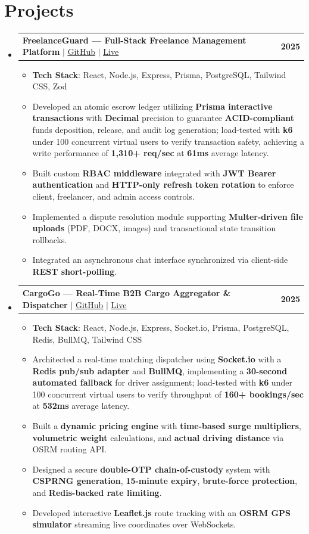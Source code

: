 \documentclass[letterpaper,11pt]{article}
\makeatletter
\newcommand{\resumeItem}[1]{
  \item\small{
    {#1 \vspace{-2pt}}
  }
}
\newcommand{\resumeProjectHeading}[2]{
    \item
    \begin{tabular*}{1.001\textwidth}{l@{\extracolsep{\fill}}r}
      \small#1 & \textbf{\small #2}\\
    \end{tabular*}\vspace{-7pt}
}
\newcommand{\resumeSubHeadingListStart}{\begin{itemize}[leftmargin=0.0in, label={}]}
\newcommand{\resumeSubHeadingListEnd}{\end{itemize}}
\newcommand{\resumeItemListStart}{\begin{itemize}}
\newcommand{\resumeItemListEnd}{\end{itemize}\vspace{-5pt}}
\makeatother
\begin{document}
\section{Projects}
    \vspace{-5pt}
    \resumeSubHeadingListStart
      \resumeProjectHeading
          {\textbf{FreelanceGuard — Full-Stack Freelance Management Platform} $|$ \href{https://github.com/aadi17-arch/FreelanceGuard}{\underline{GitHub}} $|$ \href{https://freelance-guard-mu.vercel.app}{\underline{Live}}}{2025}
          \resumeItemListStart
            \resumeItem{\textbf{Tech Stack}: React, Node.js, Express, Prisma, PostgreSQL, Tailwind CSS, Zod}
            \resumeItem{Developed an atomic escrow ledger utilizing \textbf{Prisma interactive transactions} with \textbf{Decimal} precision to guarantee \textbf{ACID-compliant} funds deposition, release, and audit log generation; load-tested with \textbf{k6} under 100 concurrent virtual users to verify transaction safety, achieving a write performance of \textbf{1,310+ req/sec} at \textbf{61ms} average latency.}
            \resumeItem{Built custom \textbf{RBAC middleware} integrated with \textbf{JWT Bearer authentication} and \textbf{HTTP-only refresh token rotation} to enforce client, freelancer, and admin access controls.}
            \resumeItem{Implemented a dispute resolution module supporting \textbf{Multer-driven file uploads} (PDF, DOCX, images) and transactional state transition rollbacks.}
            \resumeItem{Integrated an asynchronous chat interface synchronized via client-side \textbf{REST short-polling}.}
          \resumeItemListEnd
          \vspace{-13pt}
      \resumeProjectHeading
          {\textbf{CargoGo — Real-Time B2B Cargo Aggregator \& Dispatcher} $|$ \href{https://github.com/aadi17-arch/cargogo}{\underline{GitHub}} $|$ \href{https://cargogo-six.vercel.app}{\underline{Live}}}{2025}
          \resumeItemListStart
            \resumeItem{\textbf{Tech Stack}: React, Node.js, Express, Socket.io, Prisma, PostgreSQL, Redis, BullMQ, Tailwind CSS}
            \resumeItem{Architected a real-time matching dispatcher using \textbf{Socket.io} with a \textbf{Redis pub/sub adapter} and \textbf{BullMQ}, implementing a \textbf{30-second automated fallback} for driver assignment; load-tested with \textbf{k6} under 100 concurrent virtual users to verify throughput of \textbf{160+ bookings/sec} at \textbf{532ms} average latency.}
            \resumeItem{Built a \textbf{dynamic pricing engine} with \textbf{time-based surge multipliers}, \textbf{volumetric weight} calculations, and \textbf{actual driving distance} via OSRM routing API.}
            \resumeItem{Designed a secure \textbf{double-OTP chain-of-custody} system with \textbf{CSPRNG generation}, \textbf{15-minute expiry}, \textbf{brute-force protection}, and \textbf{Redis-backed rate limiting}.}
            \resumeItem{Developed interactive \textbf{Leaflet.js} route tracking with an \textbf{OSRM GPS simulator} streaming live coordinates over WebSockets.}
          \resumeItemListEnd
    \resumeSubHeadingListEnd
\vspace{-15pt}
\end{document}
